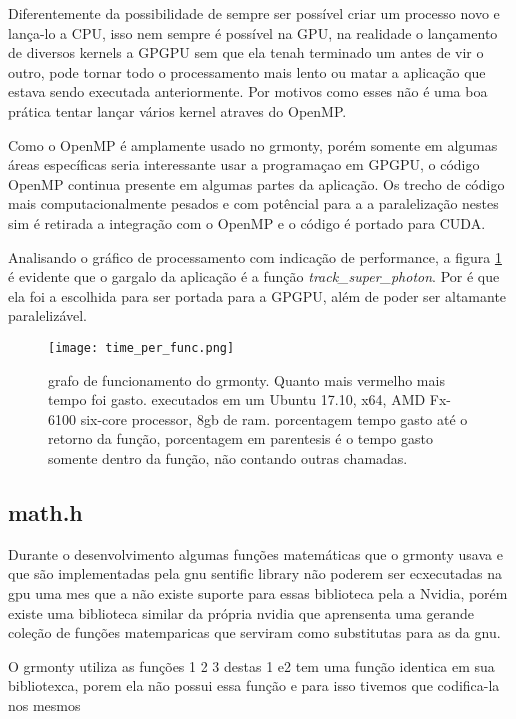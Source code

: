     Diferentemente da possibilidade de sempre ser possível criar um processo novo e lança-lo a CPU, isso nem sempre é possível na GPU, na realidade o lançamento de diversos kernels a GPGPU sem que ela tenah terminado um antes de vir o outro, pode tornar todo o processamento mais lento ou matar a aplicação que estava sendo executada anteriormente. Por motivos como esses não é uma boa prática tentar lançar vários kernel atraves do OpenMP.

    Como o OpenMP é amplamente usado no grmonty, porém somente em algumas áreas específicas seria interessante usar a programaçao em GPGPU, o código OpenMP continua presente em algumas partes da aplicação. Os trecho de código mais computacionalmente pesados e com potêncial para a a paralelização nestes sim é retirada a integração com o OpenMP e o código é portado para CUDA.

    Analisando o gráfico de processamento com indicação de performance, a figura \ref{fig:grmonty-performance} é evidente que o gargalo da aplicação é a função \textit{track\_super\_photon}. Por é que ela foi a escolhida para ser portada para a GPGPU, além de poder ser altamante paralelizável.

    \begin{figure}[!h]
      \centering
      \texttt{[image: time\_per\_func.png]}
      \caption{grafo de funcionamento do grmonty. Quanto mais vermelho mais tempo foi gasto. executados em um Ubuntu 17.10, x64, AMD Fx-6100 six-core processor, 8gb de ram. porcentagem tempo gasto até o retorno da função, porcentagem em parentesis é o tempo gasto somente dentro da função, não contando outras chamadas.}
      \label{fig:grmonty-performance}
    \end{figure}

  \subsection{math.h}
    Durante o desenvolvimento algumas funções matemáticas que o grmonty usava e que são implementadas pela gnu sentific library não poderem ser ecxecutadas na gpu uma mes que a não existe suporte para essas biblioteca pela a Nvidia, porém existe uma biblioteca similar da própria nvidia que aprensenta uma gerande coleção de funções matemparicas que serviram como substitutas para as da gnu.

    O grmonty utiliza  as funções 1 2 3 destas 1 e2 tem uma função identica  em sua bibliotexca, porem ela não possui essa função e para isso tivemos que codifica-la nos mesmos

